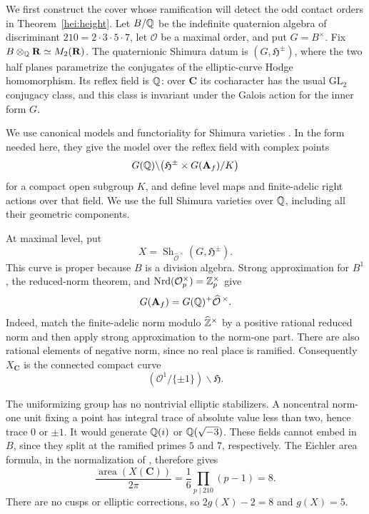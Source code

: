 We first construct the cover whose ramification will detect the odd
contact orders in Theorem~\ref{hei:height}.  Let $B/\mathbb Q$ be the
indefinite quaternion algebra of discriminant
$210=2\cdot3\cdot5\cdot7$, let $\mathcal O$ be a maximal order, and put
$G=B^\times$.  Fix $B\otimes_\mathbb Q\mathbf R\simeq M_2(\mathbf R)$.
The quaternionic Shimura datum is $(G,\mathfrak H^\pm)$, where the
two half planes parametrize the conjugates of the elliptic-curve
Hodge homomorphism.  Its reflex field is $\mathbb Q$: over $\mathbf C$ its
cocharacter has the usual $\mathrm{GL}_2$ conjugacy class, and this
class is invariant under the Galois action for the inner form $G$.

We use canonical models and functoriality for Shimura varieties
\cite{Deligne1971,Deligne1979}.  In the form needed here, they give
the model over the reflex field with complex points
\[
 G(\mathbb Q)\backslash
       \bigl(\mathfrak H^\pm\times G(\mathbf A_f)/K\bigr)
\]
for a compact open subgroup $K$, and define level maps and
finite-adelic right actions over that field.  We use the full Shimura
varieties over $\mathbb Q$, including all their geometric components.

At maximal level, put
\[
 X=\operatorname{Sh}_{\widehat{\mathcal O}^{\,\times}}
                         (G,\mathfrak H^\pm).
\]
This curve is proper because $B$ is a division algebra.  Strong
approximation for $B^1$, the reduced-norm theorem, and
$\operatorname{Nrd}(\mathcal O_p^\times)=\mathbb Z_p^\times$ give
\[
 G(\mathbf A_f)=G(\mathbb Q)^+\widehat{\mathcal O}^{\,\times}.
\]
Indeed, match the finite-adelic norm modulo $\widehat{\mathbb Z}^\times$ by
a positive rational reduced norm and then apply strong approximation
to the norm-one part.  There are also rational elements of negative
norm, since no real place is ramified.  Consequently $X_{\mathbf C}$
is the connected compact curve
\[
       (\mathcal O^1/\{\pm1\})\backslash\mathfrak H.
\]

The uniformizing group has no nontrivial elliptic stabilizers.  A
noncentral norm-one unit fixing a point has integral trace of absolute
value less than two, hence trace $0$ or $\pm1$.  It would generate
$\mathbb Q(i)$ or $\mathbb Q(\sqrt{-3})$.  These fields cannot embed in $B$, since
they split at the ramified primes $5$ and $7$, respectively.  The
Eichler area formula, in the normalization of
\cite[Theorem 39.1.2]{Voight2021}, therefore gives
\[
 \frac{\operatorname{area}(X(\mathbf C))}{2\pi}
       =\frac16\prod_{p\mid210}(p-1)=8.
\]
There are no cusps or elliptic corrections, so $2g(X)-2=8$ and
$g(X)=5$.

